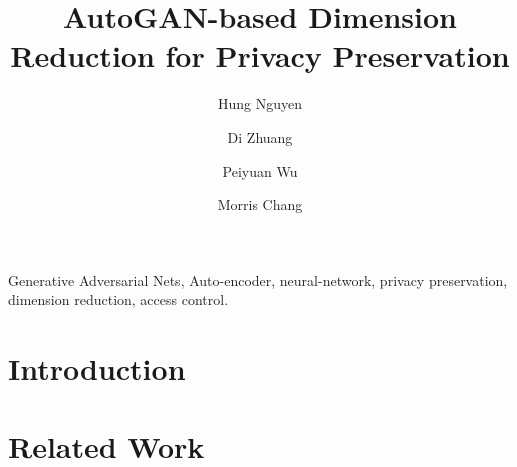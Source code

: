 \documentclass[final,5p,twocolumn]{elsarticle}
\begin{document}
	
	\newcommand{\argmin}[1]{\underset{#1}{\operatorname{arg}\,\operatorname{min}}\;}
	\newcommand{\minmax}[1]{\underset{#1}{\operatorname{min}\,\operatorname{max}}\;}	
	\newcommand{\prob}[1]{p_#1} 	
	
	\newtheorem{example}{\bf Example}
	\newtheorem{definition}{\bf Definition}
	\newtheorem{theorem}{\bf Theorem}
	\newtheorem{claim}{\bf Claim}
	\newtheorem{proposition}{\bf Proposition}
	\newtheorem{lemma}{\bf Lemma}
	\newtheorem{remark}{\bf Remark}
	\newtheorem{collolary}{\bf Collolary}
	
	
	\newcommand{\Name}{AutoGAN-based Dimension Reduction for Privacy Preservation}
	\newcommand{\shortName}{AGDRPP}
	
	
	
	\begin{frontmatter}
		
		\title{ AutoGAN-based Dimension Reduction for Privacy Preservation}
		
		\author[add1]{Hung Nguyen}
		
		\author[add1]{Di Zhuang}
		
		\author[add2]{Peiyuan Wu}
		
		\author[add1]{Morris Chang}
		
		\address[add1]{University of South Florida, USA}
		\address[add2]{National Taiwan University, Taiwan}
		
		
		\begin{abstract}
			\label{sec:abstract}
						
		\end{abstract}
		
		\begin{keyword}
			Generative Adversarial Nets, Auto-encoder, neural-network, privacy preservation, dimension reduction, access control.
		\end{keyword}
		
	\end{frontmatter}	
	
	\section{Introduction}
	\label{sec:introduction}
	
	
	\section{Related Work}
	
\end{document}
